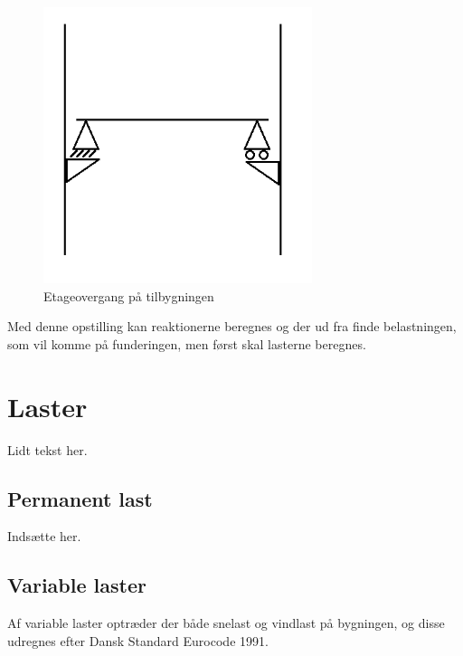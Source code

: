 \begin{figure}[htbp]
	\centering
	\includegraphics[width=0.7\textwidth]{billeder/etageovergang.png}
	\caption{Etageovergang på tilbygningen}
	\label{fig:etage}
\end{figure}

Med denne opstilling kan reaktionerne beregnes og der ud fra finde belastningen, som vil komme på funderingen, men først skal lasterne beregnes.

\section{Laster}
Lidt tekst her.

\subsection{Permanent last}
Indsætte her.

\subsection{Variable laster}
Af variable laster optræder der både snelast og vindlast på bygningen, og disse udregnes efter Dansk Standard Eurocode 1991.

